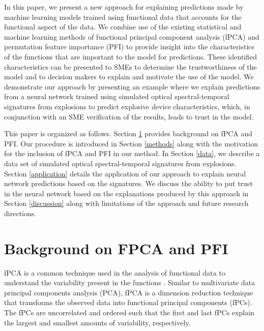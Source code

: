 \documentclass[letterpaper]{article}
\begin{document}
In this paper, we present a new approach for explaining predictions made by machine learning models trained using functional data that accounts for the functional aspect of the data. We combine use of the existing statistical and machine learning methods of functional principal component analysis (fPCA) and permutation feature importance (PFI) to provide insight into the characteristics of the functions that are important to the model for predictions. These identified characteristics can be presented to SMEs to determine the trustworthiness of the model and to decision makers to explain and motivate the use of the model. We demonstrate our approach by presenting an example where we explain predictions from a neural network trained using simulated optical spectral-temporal signatures from explosions to predict explosive device characteristics, which, in conjunction with an SME verification of the results, leads to trust in the model.

This paper is organized as follows. Section \ref{background} provides background on fPCA and PFI. Our procedure is introduced in Section \ref{methods} along with the motivation for the inclusion of fPCA and PFI in our method. In Section \ref{data}, we describe a data set of simulated optical spectral-temporal signatures from explosions. Section \ref{application} details the application of our approach to explain neural network predictions based on the signatures. We discuss the ability to put trust in the neural network based on the explanations produced by this approach in Section \ref{discussion} along with limitations of the approach and future research directions.

\section{Background on FPCA and PFI} \label{background}

fPCA is a common technique used in the analysis of functional data to understand the variability present in the functions \cite{ramsay:2005,wang:2016}. Similar to multivariate data principal components analysis (PCA), fPCA is a dimension reduction technique that transforms the observed data into functional principal components (fPCs). The fPCs are uncorrelated and ordered such that the first and last fPCs explain the largest and smallest amounts of variability, respectively.
\end{document}
